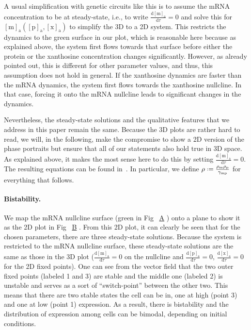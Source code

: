 \documentclass[10pt,letterpaper]{article}
\newcommand{\n}[1]{\mathrm{#1}}
\newcommand{\dd}[2]{\frac{\mathrm{d} #1}{\mathrm{d} #2}}
\newcommand*{\defeq}{\mathrel{\vcenter{\baselineskip0.5ex \lineskiplimit0pt
			\hbox{\scriptsize.}\hbox{\scriptsize.}}}%
	=}
\newcommand\subref[2]{%
	\def\myref{\getrefnumber{#1}}%
	\hyperref[#1]{\myref\mbox{#2}}%
}
\begin{document}
	A usual simplification with genetic circuits like this is to assume the mRNA
	concentration to be at steady-state, i.e., to write $\dd{\n{[m]_a}}{\tau}=0$
	and solve this for $\n{[m]_a}(\n{[p]_a},\n{[x]_a})$ to simplify the 3D to a
	2D system. This restricts the dynamics to the green surface in our plot, which
	is reasonable here because as explained above, the system first flows
	towards that surface before either the protein or the xanthosine concentration
	changes significantly. However, as already pointed out, this is different
	for other parameter values, and thus, this assumption does not hold in general.
	If the xanthosine dynamics are faster than the mRNA dynamics, the
	system first flows towards the xanthosine nullcline. In that case, forcing
	it onto the mRNA nullcline leads to significant changes in the dynamics.
	
	Nevertheless, the steady-state solutions and the qualitative features that
	we address in this paper remain the same. Because the 3D plots are rather
	hard to read, we will, in the following, make the compromise to show a 2D
	version of the phase portraits but ensure that all of our statements also
	hold true in 3D space. As explained above, it makes the most sense here to
	do this by setting $\dd{\n{[m]_a}}{\tau}=0$. The resulting equations can be
	found in~. In particular, we define $\rho \defeq
	\frac{\rho_{\n{m}} \rho_{\n{p}}}{\gamma_{\n{mp}}}$ for everything that
	follows.
	
	\paragraph*{Bistability.} 
	We map the mRNA nullcline surface (green in Fig~\subref{fig4:bistability}{A}) onto a plane to show it as the 2D plot in Fig~\subref{fig4:bistability}{B}.
	From this 2D plot, it can clearly be seen
	that for the chosen parameters, there are three steady-state solutions.
	Because the system is restricted to the mRNA nullcline surface, these steady-state solutions are the same as those in the 3D plot
	($\dd{\n{[m]_a}}{\tau}=0$ on the nullcline and $\dd{\n{[p]_a}}{\tau}=0$,
	$\dd{\n{[x]_a}}{\tau}=0$ for the 2D fixed points). One can see from the
	vector field that the two outer fixed points (labeled 1 and 3) are stable and the
	middle one (labeled 2) is unstable and serves as a sort of ``switch-point''
	between the other two. This means that there are two stable states the cell
	can be in, one at high (point 3) and one at low (point 1) expression. As a
	result, there is bistability and the distribution of expression among cells
	can be bimodal, depending on initial conditions.
	
\end{document}
